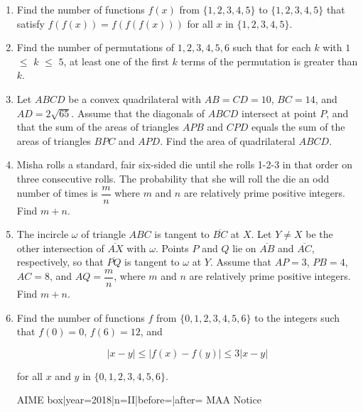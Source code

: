 \documentclass{article}
\begin{document}
\begin{enumerate}[label=\arabic*., itemsep=0.5em]
\par \vspace{0.5em}\item Find the number of functions $f(x)$ from $\{1, 2, 3, 4, 5\}$ to $\{1, 2, 3, 4, 5\}$ that satisfy $f(f(x)) = f(f(f(x)))$ for all $x$ in $\{1, 2, 3, 4, 5\}$.\par \vspace{0.5em}\item Find the number of permutations of $1, 2, 3, 4, 5, 6$ such that for each $k$ with $1$ $\leq$ $k$ $\leq$ $5$, at least one of the first $k$ terms of the permutation is greater than $k$.\par \vspace{0.5em}\item Let $ABCD$ be a convex quadrilateral with $AB = CD = 10$, $BC = 14$, and $AD = 2\sqrt{65}$. Assume that the diagonals of $ABCD$ intersect at point $P$, and that the sum of the areas of triangles $APB$ and $CPD$ equals the sum of the areas of triangles $BPC$ and $APD$. Find the area of quadrilateral $ABCD$.\par \vspace{0.5em}\item Misha rolls a standard, fair six-sided die until she rolls 1-2-3 in that order on three consecutive rolls. The probability that she will roll the die an odd number of times is $\dfrac{m}{n}$ where $m$ and $n$ are relatively prime positive integers. Find $m+n$.\par \vspace{0.5em}\item The incircle $\omega$ of triangle $ABC$ is tangent to $\overline{BC}$ at $X$. Let $Y \neq X$ be the other intersection of $\overline{AX}$ with $\omega$. Points $P$ and $Q$ lie on $\overline{AB}$ and $\overline{AC}$, respectively, so that $\overline{PQ}$ is tangent to $\omega$ at $Y$. Assume that $AP = 3$, $PB = 4$, $AC = 8$, and $AQ = \dfrac{m}{n}$, where $m$ and $n$ are relatively prime positive integers. Find $m+n$.\par \vspace{0.5em}\item Find the number of functions $f$ from $\{0, 1, 2, 3, 4, 5, 6\}$ to the integers such that $f(0) = 0$, $f(6) = 12$, and


\begin{equation*}
|x - y|  \leq  |f(x) - f(y)|  \leq  3|x - y|
\end{equation*}


for all $x$ and $y$ in $\{0, 1, 2, 3, 4, 5, 6\}$.



{{AIME box|year=2018|n=II|before=|after=}}
{{MAA Notice}}\par \vspace{0.5em}\end{enumerate}
\end{document}
